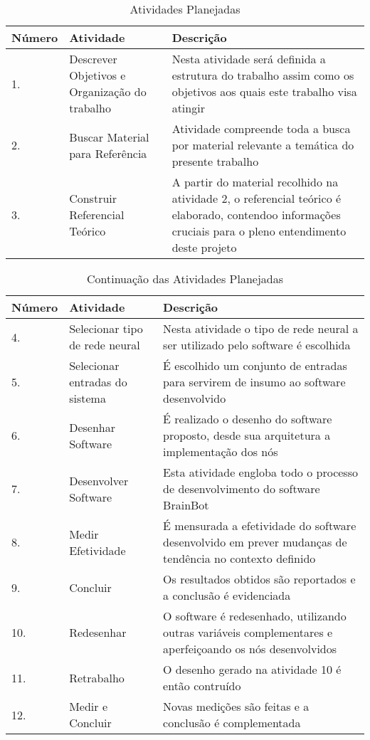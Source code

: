 \begin{table}[h]
	\centering
	\caption{Atividades Planejadas}
	\label{tab01}
  \begin{center}
      \begin{tabular}{ | l | p{5cm} | p{5cm}}
      \hline
      Número & Atividade & Descrição \\ \hline
      1. & Descrever Objetivos e Organização do trabalho & Nesta atividade será definida a estrutura do trabalho assim como os objetivos aos quais este trabalho visa atingir\\ \hline
      2. & Buscar Material para Referência & Atividade compreende toda a busca por material relevante a temática do presente trabalho \\ \hline
      3. & Construir Referencial Teórico & A partir do material recolhido na atividade 2, o referencial teórico é elaborado, contendoo informações cruciais para o pleno entendimento deste projeto \\ \hline
      \end{tabular}
  \end{center}
\end{table}

\begin{table}[h]
	\centering
	\caption{Continuação das Atividades Planejadas}
	\label{tab02}
  \begin{center}
      \begin{tabular}{ | l | p{5cm} | p{5cm}}
      \hline
      Número & Atividade & Descrição \\ \hline
			4. & Selecionar tipo de rede neural & Nesta atividade o tipo de rede neural a ser utilizado pelo software é escolhida \\ \hline
			5. & Selecionar entradas do sistema & É escolhido um conjunto de entradas para servirem de insumo ao software desenvolvido \\ \hline
			6. & Desenhar Software & É realizado o desenho do software proposto, desde sua arquitetura a implementação dos nós \\ \hline
			7. & Desenvolver Software & Esta atividade engloba todo o processo de desenvolvimento do software BrainBot \\ \hline
			8. & Medir Efetividade & É mensurada a efetividade do software desenvolvido em prever mudanças de tendência no contexto definido \\ \hline
			9. & Concluir & Os resultados obtidos são reportados e a conclusão é evidenciada  \\ \hline
      10. & Redesenhar & O software é redesenhado, utilizando outras variáveis complementares e aperfeiçoando os nós desenvolvidos  \\ \hline
      11. & Retrabalho & O desenho gerado na atividade 10 é então contruído  \\ \hline
      12. & Medir e Concluir & Novas medições são feitas e a conclusão é complementada \\ \hline
      \end{tabular}
  \end{center}
\end{table}



